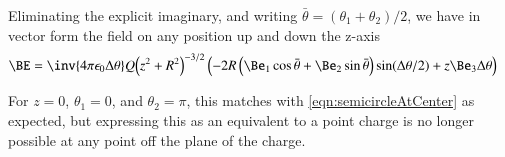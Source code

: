\documentclass{article}
\begin{document}
Eliminating the explicit imaginary, and writing $\bar{\theta} = (\theta_1 + \theta_2)/2$, we have in vector form
the field on any position up and down the z-axis
\begin{align}
\BE 
&= \inv{4 \pi \epsilon_0 \Delta\theta} Q { \left(z^2 + R^2\right) }^{-3/2}
\left(
-2 R \left( \Be_1 \cos \bar\theta +\Be_2 \sin\bar\theta \right) \sin(\Delta\theta/2)
+ z \Be_3 \Delta\theta \right) 
\end{align}

For $z = 0$, $\theta_1 = 0$, and $\theta_2 = \pi$, this matches with \ref{eqn:semicircleAtCenter} as expected, but
expressing this as an equivalent to a point charge is no longer possible at any point off the plane of the
charge.



\end{document}
